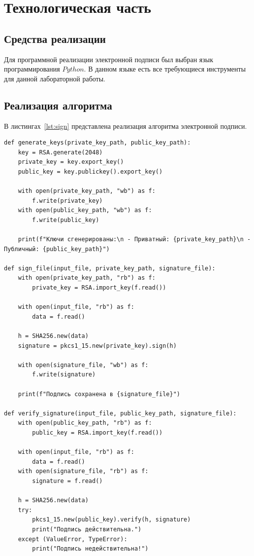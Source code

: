\chapter{Технологическая часть}

\section{Средства реализации}

Для программной реализации электронной подписи был выбран язык программирования $Python$. В данном языке есть все требующиеся инструменты для данной лабораторной работы.

\section{Реализация алгоритма}

В листингах~\ref{lst:sign} представлена реализация алгоритма электронной подписи.

\begin{center}
\captionsetup{justification=raggedright,singlelinecheck=off}
\begin{lstlisting}[label=lst:sign,caption=Реализация электронной подписи]
def generate_keys(private_key_path, public_key_path):
    key = RSA.generate(2048)
    private_key = key.export_key()
    public_key = key.publickey().export_key()

    with open(private_key_path, "wb") as f:
        f.write(private_key)
    with open(public_key_path, "wb") as f:
        f.write(public_key)

    print(f"Ключи сгенерированы:\n - Приватный: {private_key_path}\n - Публичный: {public_key_path}")

def sign_file(input_file, private_key_path, signature_file):
    with open(private_key_path, "rb") as f:
        private_key = RSA.import_key(f.read())

    with open(input_file, "rb") as f:
        data = f.read()

    h = SHA256.new(data)
    signature = pkcs1_15.new(private_key).sign(h)

    with open(signature_file, "wb") as f:
        f.write(signature)
    
    print(f"Подпись сохранена в {signature_file}")

def verify_signature(input_file, public_key_path, signature_file):
    with open(public_key_path, "rb") as f:
        public_key = RSA.import_key(f.read())

    with open(input_file, "rb") as f:
        data = f.read()
    with open(signature_file, "rb") as f:
        signature = f.read()

    h = SHA256.new(data)
    try:
        pkcs1_15.new(public_key).verify(h, signature)
        print("Подпись действительна.")
    except (ValueError, TypeError):
        print("Подпись недействительна!")
\end{lstlisting}
\end{center}

